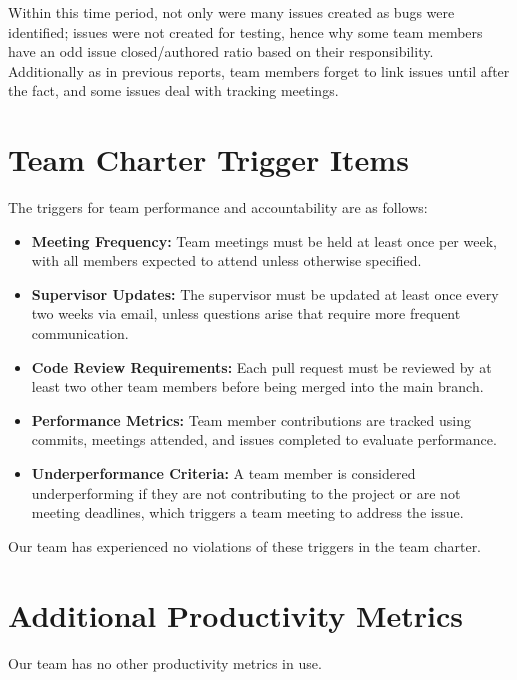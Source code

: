 \documentclass{article}
\begin{document}
Within this time period, not only were many issues created as bugs were identified; issues were not created for testing, 
hence why some team members have an odd issue closed/authored ratio based on their responsibility. Additionally as in previous
reports, team members forget to link issues until after the fact, and some issues deal with tracking meetings.

\section{Team Charter Trigger Items}

The triggers for team performance and accountability are as follows:

\begin{itemize}
    \item \textbf{Meeting Frequency:} Team meetings must be held at least once per week, with all members expected to attend unless otherwise specified.
    \item \textbf{Supervisor Updates:} The supervisor must be updated at least once every two weeks via email, unless questions arise that require more frequent communication.
    \item \textbf{Code Review Requirements:} Each pull request must be reviewed by at least two other team members before being merged into the main branch.
    \item \textbf{Performance Metrics:} Team member contributions are tracked using commits, meetings attended, and issues completed to evaluate performance.
    \item \textbf{Underperformance Criteria:} A team member is considered underperforming if they are not contributing to the project or are not meeting deadlines, which triggers a team meeting to address the issue.
\end{itemize}

Our team has experienced no violations of these triggers in the team charter.

\section{Additional Productivity Metrics}

Our team has no other productivity metrics in use.
\end{document}
